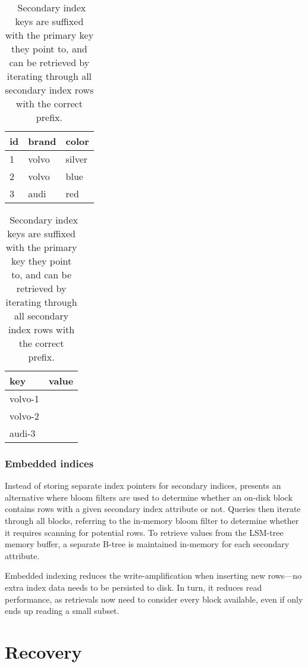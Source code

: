 \begin{table}[H]
  \centering
  \begin{tabular}{l l l}
    \toprule
    \textbf{id} & \textbf{brand} & \textbf{color} \\ \midrule
    1 & volvo & silver \\ \midrule
    2 & volvo & blue \\ \midrule
    3 & audi & red \\ \bottomrule
  \end{tabular}
  \quad
  \begin{tabular}{l l}
    \toprule
    \textbf{key} & \textbf{value} \\ \midrule
    volvo-1 & \\ \midrule
    volvo-2 & \\ \midrule
    audi-3 & \\ \bottomrule
  \end{tabular}

  \caption{\
    Secondary index keys are suffixed with the primary key they point to, and
    can be retrieved by iterating through all secondary index rows with the
    correct prefix.
  }\label{table:secondary-order}
\end{table}

\subsubsection{Embedded indices}

Instead of storing separate index pointers for secondary indices,
\cite{lsm-comparison} presents an alternative where bloom filters are used to
determine whether an on-disk block contains rows with a given secondary index
attribute or not. Queries then iterate through all blocks, referring to the
in-memory bloom filter to determine whether it requires scanning for potential
rows. To retrieve values from the LSM-tree memory buffer, a separate B-tree is
maintained in-memory for each secondary attribute.

Embedded indexing reduces the write-amplification when inserting new rows---no
extra index data needs to be persisted to disk. In turn, it reduces read
performance, as retrievals now need to consider every block available, even if
only ends up reading a small subset.

\section{Recovery}

